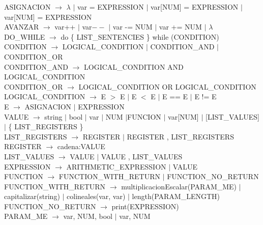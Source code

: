 \documentclass[10pt,a4paper]{article}
\begin{document}
ASIGNACION $\rightarrow$ $\lambda$ $|$ var = EXPRESSION $|$ var[NUM] = EXPRESSION $|$ var[NUM] = EXPRESSION\\

AVANZAR $\rightarrow$ var++ $|$ var$--$ $|$ var -= NUM $|$ var += NUM $|$ $\lambda$ \\

DO\_WHILE $\rightarrow$ do \{ LIST\_SENTENCIES \} while (CONDITION) \\

CONDITION $\rightarrow$ LOGICAL\_CONDITION $|$ CONDITION\_AND $|$ CONDITION\_OR \\

CONDITION\_AND $\rightarrow$ LOGICAL\_CONDITION AND LOGICAL\_CONDITION \\

CONDITION\_OR $\rightarrow$ LOGICAL\_CONDITION OR LOGICAL\_CONDITION \\

LOGICAL\_CONDITION $\rightarrow$ E $>$ E $|$ E $<$ E $|$ E == E $|$ E != E \\

E $\rightarrow$ ASIGNACION $|$ EXPRESSION \\

VALUE $\rightarrow$ string $|$ bool $|$ var $|$ NUM $|$FUNCION $|$ var[NUM] $|$ [LIST\_VALUES] $|$ \{ LIST\_REGISTERS \}\\

LIST\_REGISTERS $\rightarrow$ REGISTER $|$ REGISTER , LIST\_REGISTERS\\

REGISTER $\rightarrow$ cadena:VALUE \\

LIST\_VALUES $\rightarrow$ VALUE $|$ VALUE , LIST\_VALUES \\

EXPRESSION $\rightarrow$  ARITHMETIC\_EXPRESSION $|$ VALUE \\

FUNCTION $\rightarrow$ FUNCTION\_WITH\_RETURN $|$ FUNCTION\_NO\_RETURN \\

FUNCTION\_WITH\_RETURN $\rightarrow$ multiplicacionEscalar(PARAM\_ME) $|$  capitalizar(string) $|$  colineales(var, var) $|$ length(PARAM\_LENGTH) \\

FUNCTION\_NO\_RETURN $\rightarrow$ print(EXPRESSION) \\

PARAM\_ME $\rightarrow$ var, NUM, bool $|$ var, NUM \\
\end{document}
